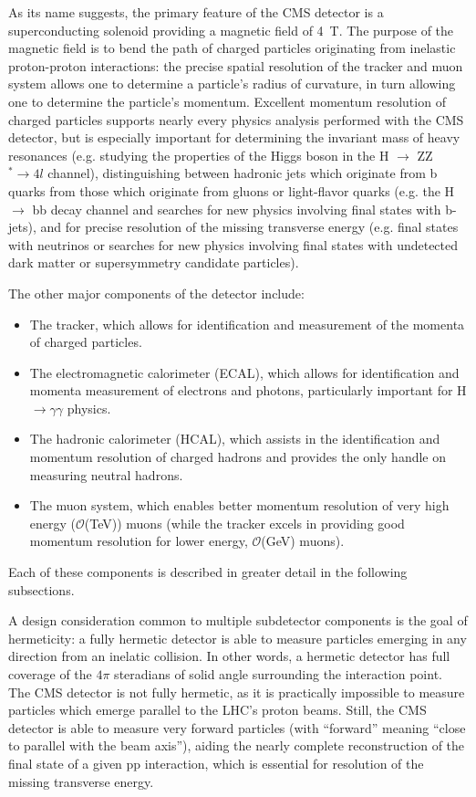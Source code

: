 As its name suggests, the primary feature of the CMS detector is a superconducting solenoid providing a magnetic field of 4~T.
The purpose of the magnetic field is to bend the path of charged particles originating from inelastic proton-proton interactions: the precise spatial resolution of the tracker and muon system allows one to determine a particle's radius of curvature, in turn allowing one to determine the particle's momentum.
Excellent momentum resolution of charged particles supports nearly every physics analysis performed with the CMS detector, but is especially important for determining the invariant mass of heavy resonances (e.g. studying the properties of the Higgs boson in the H $\to$ ZZ$^{*} \to 4l$ channel), distinguishing between hadronic jets which originate from b quarks from those which originate from gluons or light-flavor quarks (e.g. the H $\to$ bb decay channel and searches for new physics involving final states with b-jets), and for precise resolution of the missing transverse energy (e.g. final states with neutrinos or searches for new physics involving final states with undetected dark matter or supersymmetry candidate particles).

The other major components of the detector include: 
\begin{itemize}
    \item The tracker, which allows for identification and measurement of the momenta of charged particles.
    \item The electromagnetic calorimeter (ECAL), which allows for identification and momenta measurement of electrons and photons, particularly important for H $\to \gamma \gamma$ physics.
    \item The hadronic calorimeter (HCAL), which assists in the identification and momentum resolution of charged hadrons and provides the only handle on measuring neutral hadrons.
    \item The muon system, which enables better momentum resolution of very high energy ($\mathcal O$(TeV)) muons (while the tracker excels in providing good momentum resolution for lower energy, $\mathcal O$(GeV) muons).
\end{itemize}
Each of these components is described in greater detail in the following subsections.

A design consideration common to multiple subdetector components is the goal of hermeticity: a fully hermetic detector is able to measure particles emerging in any direction from an inelatic collision.
In other words, a hermetic detector has full coverage of the $4\pi$ steradians of solid angle surrounding the interaction point.
The CMS detector is not fully hermetic, as it is practically impossible to measure particles which emerge parallel to the LHC's proton beams.
Still, the CMS detector is able to measure very forward particles (with ``forward'' meaning ``close to parallel with the beam axis''), aiding the nearly complete reconstruction of the final state of a given pp interaction, which is essential for resolution of the missing transverse energy.


